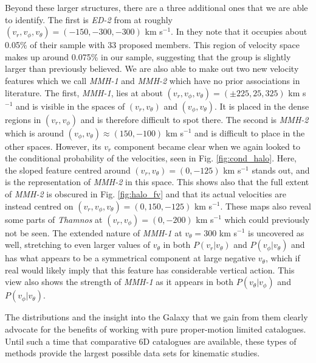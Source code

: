 Beyond these larger structures, there are a three additional ones that we are able to identify. The first is \textit{ED-2} from \cite{dodd:22} at roughly $(v_r, v_\phi, v_\theta) = (-150, -300, -300)$ km s$^{-1}$. In \cite{dodd:22} they note that it occupies about 0.05\% of their sample with 33 proposed members. This region of velocity space makes up around 0.075\% in our sample, suggesting that the group is slightly larger than previously believed. We are also able to make out two new velocity features which we call \textit{MMH-1} and \textit{MMH-2} which have no prior associations in literature. The first, \textit{MMH-1}, lies at about $(v_r, v_\phi, v_\theta) = (\pm225, 25, 325)$ km s$^{-1}$ and is visible in the spaces of $(v_r, v_\theta)$ and $(v_\phi, v_\theta)$. It is placed in the dense regions in $(v_r, v_\phi)$ and is therefore difficult to spot there. The second is \textit{MMH-2} which is around $(v_\phi, v_\theta) \approx (150, -100)$ km s$^{-1}$ and is difficult to place in the other spaces. However, its $v_r$ component became clear when we again looked to the conditional probability of the velocities, seen in Fig. \ref{fig:cond_halo}. Here, the sloped feature centred around $(v_r, v_\theta) = (0, -125)$ km s$^{-1}$ stands out, and is the representation of \textit{MMH-2} in this space. This shows also that the full extent of \textit{MMH-2} is obscured in Fig. \ref{fig:halo_fv} and that its actual velocities are instead centred on $(v_r, v_\phi, v_\theta) = (0, 150, -125)$ km s$^{-1}$.  These maps also reveal some parts of \textit{Thamnos} at $(v_r, v_\phi) = (0, -200)$ km s$^{-1}$ which could previously not be seen. The extended nature of \textit{MMH-1} at $v_\theta = 300$ km s$^{-1}$ is uncovered as well, stretching to even larger values of $v_\theta$ in both $P(v_r|v_\theta)$ and $P(v_\phi|v_\theta)$ and has what appears to be a symmetrical component at large negative $v_\theta$, which if real would likely imply that this feature has considerable vertical action. This view also shows the strength of \textit{MMH-1} as it appears in both $P(v_\theta|v_\phi)$ and $P(v_\phi|v_\theta)$.

The distributions and the insight into the Galaxy that we gain from them clearly advocate for the benefits of working with pure proper-motion limited catalogues. Until such a time that comparative 6D catalogues are available, these types of methods provide the largest possible data sets for kinematic studies. 

